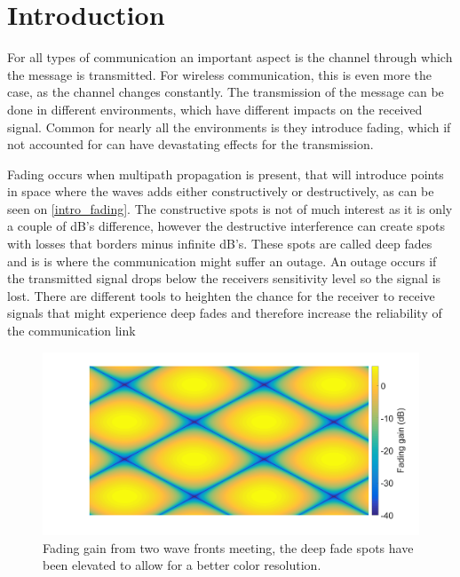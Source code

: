 \chapter{Introduction}

%





For all types of communication an important aspect is the channel through which the message is transmitted. For wireless communication, this is even more the case, as the channel changes constantly. The transmission of the message can be done in different environments, which have different impacts on the received signal. Common for nearly all the environments is they introduce fading, which if not accounted for can have devastating effects for the transmission. 

Fading occurs when multipath propagation is present, that will introduce points in space where the waves adds either constructively or destructively, as can be seen on \autoref{intro_fading}. The constructive spots is not of much interest as it is only a couple of dB's difference, however the destructive interference can create spots with losses that borders minus infinite dB's. These spots are called deep fades and is is where the communication might suffer an outage. An outage occurs if the transmitted signal drops below the receivers sensitivity level so the signal is lost. There are different tools to heighten the chance for the receiver to receive signals that might experience deep fades and therefore increase the reliability of the communication link


\begin{figure}[H]
\centering
\includegraphics[width=\textwidth]{figures/intro_fading.png}
\caption{Fading gain from two wave fronts meeting, the deep fade spots have been elevated to allow for a better color resolution.}
\label{intro_fading}
\end{figure}

